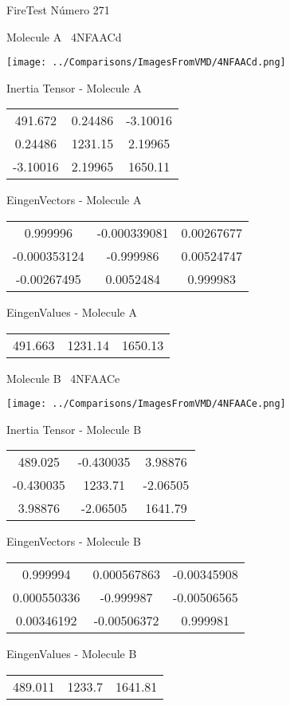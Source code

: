 \vtab[-3cm]
\begin{center}
{\large FireTest \tab Número 271}
\end{center}
\begin{multicols}{2}
\begin{center}

Molecule A \
4NFAACd

\texttt{[image: ../Comparisons/ImagesFromVMD/4NFAACd.png]}

Inertia Tensor - Molecule A \\
\begin{tabular}{|c c c|}
491.672	 & 	0.24486	 & 	-3.10016	 \\
0.24486	 & 	1231.15	 & 	2.19965	 \\
-3.10016	 & 	2.19965	 & 	1650.11
\end{tabular}

\vtab
 EingenVectors - Molecule A     \\
\begin{tabular}{|c c c|}
0.999996	 & 	-0.000339081	 & 	0.00267677	 \\
-0.000353124	 & 	-0.999986	 & 	0.00524747	 \\
-0.00267495	 & 	0.0052484	 & 	0.999983
\end{tabular}

\vtab
 EingenValues - Molecule A     \\
\begin{tabular}{|c c c|}
491.663	 & 	1231.14	 & 	1650.13	 \\
\end{tabular}
\columnbreak

Molecule B \
4NFAACe

\texttt{[image: ../Comparisons/ImagesFromVMD/4NFAACe.png]}

Inertia Tensor - Molecule B \\
\begin{tabular}{|c c c|}
489.025	 & 	-0.430035	 & 	3.98876	 \\
-0.430035	 & 	1233.71	 & 	-2.06505	 \\
3.98876	 & 	-2.06505	 & 	1641.79
\end{tabular}

\vtab
 EingenVectors - Molecule B     \\
\begin{tabular}{|c c c|}
0.999994	 & 	0.000567863	 & 	-0.00345908	 \\
0.000550336	 & 	-0.999987	 & 	-0.00506565	 \\
0.00346192	 & 	-0.00506372	 & 	0.999981
\end{tabular}

\vtab
 EingenValues - Molecule B     \\
\begin{tabular}{|c c c|}
489.011	 & 	1233.7	 & 	1641.81	 \\
\end{tabular}

\end{center}
\end{multicols}

